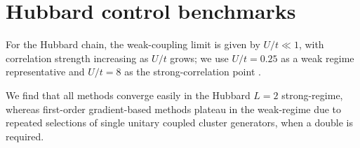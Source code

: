 \documentclass[
  reprint,
  amsmath,
  amssymb,
  aps,
  pra,
  nofootinbib,
  superscriptaddress,
  floatfix
]{revtex4-2}
\begin{document}
\section{Hubbard control benchmarks}

For the Hubbard chain, the weak-coupling limit is given by
\(U/t\ll 1\), with correlation strength increasing as \(U/t\) grows;
we use \(U/t=0.25\) as a weak regime representative and \(U/t=8\) as the strong-correlation point
\cite{Arovas2022Hubbard}.  

We find that all methods converge easily in the Hubbard $L=2$ strong-regime, whereas first-order gradient-based methods plateau in the weak-regime due to repeated selections of single unitary coupled cluster generators, when a double is required. 

\end{document}
